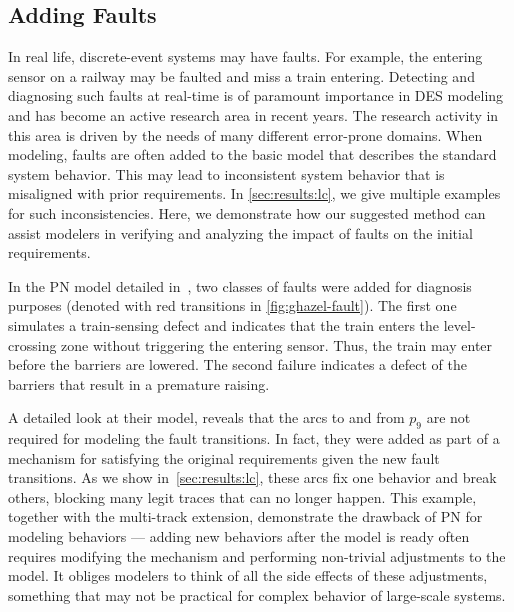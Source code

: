 \documentclass[10pt,journal,compsoc]{IEEEtran}
\theoremstyle{definition}
\begin{document}
\subsection{Adding Faults}
\label{sec:comparing-bp-and-pn:faults}
In real life, discrete-event systems may have faults. For example, the entering sensor on a railway may be faulted and miss a train entering. Detecting and diagnosing such faults at real-time is of paramount importance in DES modeling and has become an active research area in recent years. The research activity in this area is driven by the needs of many different error-prone domains. When modeling, faults are often added to the basic model that describes the standard system behavior. This may lead to inconsistent system behavior that is misaligned with prior requirements. In \autoref{sec:results:lc}, we give multiple examples for such inconsistencies. Here, we demonstrate how our suggested method can assist modelers in verifying and analyzing the impact of faults on the initial requirements.

In the PN model detailed in~\cite{ghazel2016customizable}, two classes of faults were added for diagnosis purposes (denoted with red transitions in \autoref{fig:ghazel-fault}). The first one simulates a train-sensing defect and indicates that the train enters the level-crossing zone without triggering the entering sensor. Thus, the train may enter before the barriers are lowered. The second failure indicates a defect of the barriers that result in a premature raising.

A detailed look at their model, reveals that the arcs to and from $p_9$ are not required for modeling the fault transitions. In fact, they were added as part of a mechanism for satisfying the original requirements given the new fault transitions. 
As we show in~\autoref{sec:results:lc}, these arcs fix one behavior and break others, blocking many legit traces that can no longer happen. This example, together with the multi-track extension, demonstrate the drawback of PN for modeling behaviors --- adding new behaviors after the model is ready often requires modifying the mechanism and performing non-trivial adjustments to the model. It obliges modelers to think of all the side effects of these adjustments, something that may not be practical for complex behavior of large-scale systems.
\end{document}
